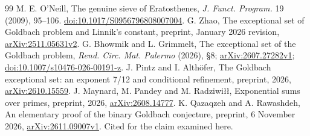 \documentclass[11pt,a4paper]{article}
\begin{document}
\begin{thebibliography}{99}
 M. E. O'Neill, The genuine sieve of Eratosthenes, \emph{J. Funct. Program.} 19 (2009), 95--106. \href{https://doi.org/10.1017/S0956796808007004}{doi:10.1017/S0956796808007004}.
 G. Zhao, The exceptional set of Goldbach problem and Linnik's constant, preprint, January 2026 revision, \href{https://arxiv.org/abs/2511.05631v2}{arXiv:2511.05631v2}.
 G. Bhowmik and L. Grimmelt, The exceptional set of the Goldbach problem, \emph{Rend. Circ. Mat. Palermo} (2026), §8; \href{https://arxiv.org/abs/2607.27282v1}{arXiv:2607.27282v1}; \href{https://doi.org/10.1007/s10476-026-00191-z}{doi:10.1007/s10476-026-00191-z}.
 J. Pintz and I. Althöfer, The Goldbach exceptional set: an exponent 7/12 and conditional refinement, preprint, 2026, \href{https://arxiv.org/abs/2610.15559}{arXiv:2610.15559}.
 J. Maynard, M. Pandey and M. Radziwiłł, Exponential sums over primes, preprint, 2026, \href{https://arxiv.org/abs/2608.14777}{arXiv:2608.14777}.
 K. Qazaqzeh and A. Rawashdeh, An elementary proof of the binary Goldbach conjecture, preprint, 6 November 2026, \href{https://arxiv.org/abs/2611.09007v1}{arXiv:2611.09007v1}. Cited for the claim examined here.


\end{thebibliography}
\end{document}
